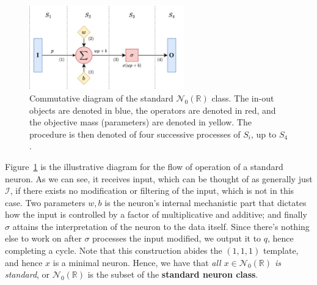 \begin{figure}[!htp]
    \centering
    \includegraphics[width=0.6\textwidth]{img/standard_n0_class.png}
    \caption{Commutative diagram of the standard $\mathcal{N}_{0}(\mathbb{R})$ class. The in-out objects are denoted in blue, the operators are denoted in red, and the objective mass (parameters) are denoted in yellow. The procedure is then denoted of four successive processes of $S_{i}$, up to $S_{4}$.}
    \label{fig:comm_diag_standard_neuron}
\end{figure}
Figure~\ref{fig:comm_diag_standard_neuron} is the illustrative diagram for the flow of operation of a standard neuron. As we can see, it receives input, which can be thought of as generally just $\mathcal{I}$, if there exists no modification or filtering of the input, which is not in this case. Two parameters $w,b$ is the neuron's internal mechanistic part that dictates how the input is controlled by a factor of multiplicative and additive; and finally $\sigma$ attains the interpretation of the neuron to the data itself. Since there's nothing else to work on after $\sigma$ processes the input modified, we output it to $q$, hence completing a cycle. Note that this construction abides the $(1,1,1)$ template, and hence $x$ is a minimal neuron. Hence, we have that \textit{all $x\in \mathcal{N}_{0}(\mathbb{R})$ is standard}, or $\mathcal{N}_{0}(\mathbb{R})$ is the subset of the \textbf{standard neuron class}. 

